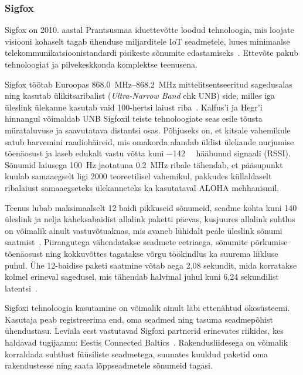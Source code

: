 \documentclass[12pt]{article}
\begin{document}
    \subsubsection{Sigfox}

    Sigfox on 2010. aastal Prantsusmaa iduettevõtte loodud tehnoloogia, mis loojate visiooni kohaselt tagab ühenduse miljarditele IoT seadmetele, luues minimaalse telekommunikatsioonistandardi pisikeste sõnumite edastamiseks~\cite{sigfox}.
    Ettevõte pakub tehnoloogiat ja pilvekeskkonda komplektse teenusena.

    Sigfox töötab Euroopas \SIrange{868.0}{868.2}{\mega\hertz} mittelitsentseeritud sagedusalas ning kasutab ülikitsaribalist (\textit{Ultra-Narrow Band} ehk UNB) side, milles iga üleslink ülekanne kasutab vaid 100-hertsi laiust riba~\cite{sigfoxtech}.
    Kalfus'i ja Hegr'i~\cite{kalfus2016ultra} hinnangul võimaldab UNB Sigfoxil teiste tehnoloogiate seas esile tõusta mürataluvuse ja saavutatava distantsi osas.
    Põhjuseks on, et kitsale vahemikule satub harvemini raadiohäireid, mis omakorda alandab üldist ülekande nurjumise tõenäosust ja laseb edukalt vastu võtta kuni \SI{-142}{\deci\belm} hääbunud signaali (RSSI).
    Sõnumid laiusega \SI{100}{\hertz} jaotatuna \SI{0,2}{\mega\hertz} ribale tähendab, et pääsupunkt kuulab samaaegselt ligi 2000 teoreetilisel vahemikul, pakkudes küllaldaselt ribalaiust samaaegseteks ülekanneteks ka kasutataval ALOHA mehhanismil.

    Teenus lubab maksimaalselt 12 baidi pikkuseid sõnumeid, seadme kohta kuni 140 üleslink ja nelja kaheksabaidist allalink paketti päevas, kusjuures allalink suhtlus on võimalik ainult vastuvõtuaknas, mis avaneb lühidalt peale üleslink sõnumi saatmist~\cite{sigfoxtech}.
    Piirangutega vähendatakse seadmete eetriaega, sõnumite põrkumise tõenäosust ning kokkuvõttes tagatakse võrgu töökindlus ka suurema liikluse puhul.
    Ühe 12-baidise paketi saatmine võtab aega 2,08 sekundit, mida korratakse kolmel erineval sagedusel, mis tähendab halvimal juhul kuni 6,24 sekundilist latentsi~\cite{sigfoxtech}.

    Sigfoxi tehnoloogia kasutamine on võimalik ainult läbi ettenähtud ökosüsteemi.
    Kasutaja peab registreerima end, oma seadmed ning tasuma seadmepõhist ühendustasu.
    Leviala eest vastutavad Sigfoxi partnerid erinevates riikides, kes haldavad tugijaamu: Eestis Connected Baltics~\cite{sfCoverage}.
    Rakendusliidesega on võimalik korraldada suhtlust füüsiliste seadmetega, suunates kuuldud paketid oma rakendustesse ning saata lõppseadmetele sõnumeid tagasi.
\end{document}
